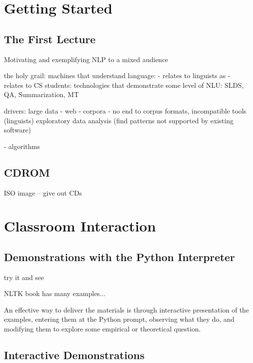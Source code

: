 \documentclass[11pt]{article}
\begin{document}
\section{Getting Started}

\subsection{The First Lecture}

Motivating and exemplifying NLP to a mixed audience

the holy grail: machines that understand language:
- relates to linguists as 
- relates to CS students: technologies that demonstrate some level of NLU:
  SLDS, QA, Summarization, MT

drivers: large data
- web
- corpora
- no end to corpus formats, incompatible tools (linguists)
  exploratory data analysis (find patterns not supported by existing software)



- algorithms


\subsection{CDROM}

ISO image -- give out CDs




\section{Classroom Interaction}

\subsection{Demonstrations with the Python Interpreter}

try it and see

NLTK book has many examples...

An effective way to deliver the materials is through interactive
presentation of the examples, entering them at the Python prompt,
observing what they do, and modifying them to explore some empirical
or theoretical question.


\subsection{Interactive Demonstrations}
\end{document}

